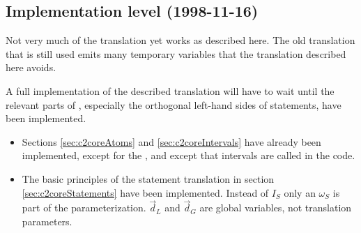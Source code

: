 \begin{docpart}
\subsection{Implementation level (1998-11-16)}
Not very much of the \ctoc translation yet works as described
here. The old translation that is still used emits many temporary
variables that the translation described here avoids.

A full implementation of the described translation will have to
wait until the relevant parts of \coreC, especially the orthogonal
left-hand sides of statements, have been implemented.

\begin{itemize}
\item Sections \ref{sec:c2coreAtoms} and \ref{sec:c2coreIntervals}
have already been implemented, except for the ,
and except that intervals are called  in the code.
\item The basic principles of the statement translation in
section \ref{sec:c2coreStatements} have been implemented. Instead
of $I_S$ only an $\omega_S$ is part of the parameterization.
$\vec d_L$ and $\vec d_G$ are global variables, not translation
parameters.
\end{itemize}

\end{docpart}

